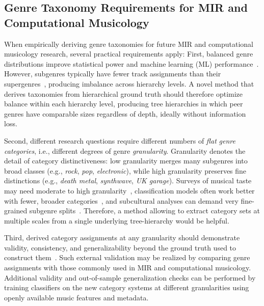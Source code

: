 \documentclass{article}
\begin{document}
\subsection{Genre Taxonomy Requirements for MIR and Computational Musicology}
When empirically deriving genre taxonomies for future MIR and computational musicology research, several practical requirements apply: First, balanced genre distributions improve statistical power and machine learning (ML) performance~\citep{japkowiczClassImbalanceProblem2002}. However, subgenres typically have fewer track assignments than their supergenres~\citep{bogdanovAcousticbrainzGenreDataset2019}, producing imbalance across hierarchy levels. A novel method that derives taxonomies from hierarchical ground truth should therefore optimize balance within each hierarchy level, producing tree hierarchies in which peer genres have comparable sizes regardless of depth, ideally without information loss.

Second, different research questions require different numbers of \textit{flat} \textit{genre categories}, i.e., different degrees of genre \textit{granularity}. Granularity denotes the detail of category distinctiveness: low granularity merges many subgenres into broad classes (e.g., \textit{rock}, \textit{pop}, \textit{electronic}), while high granularity preserves fine distinctions (e.g., \textit{death metal}, \textit{synthwave}, \textit{UK garage}). Surveys of musical taste may need moderate to high granularity~\citep[e.g., 24 genres]{langeCategorizingMusicGenres2025}, classification models often work better with fewer, broader categories~\citep{genussovMusicalGenreClassification2010}, and subcultural analyses can demand very fine-grained subgenre splits~\citep{caparriniAutomaticSubgenreClassification2020}. Therefore, a method allowing to extract category sets at multiple scales from a single underlying tree-hierarchy would be helpful.

Third, derived category assignments at any granularity should demonstrate validity, consistency, and generalizability beyond the ground truth used to construct them~\citep{sturmReviewValidityIts2023}. Such external validation may be realized by comparing genre assignments with those commonly used in MIR and computational musicology. Additional validity and out-of-sample generalization checks can be performed by training classifiers on the new category systems at different granularities using openly available music features and metadata.
\end{document}
